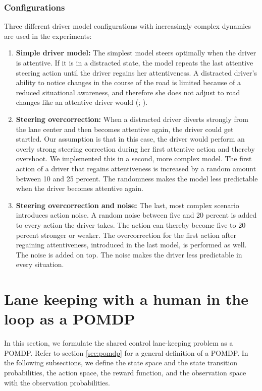 \subsubsection{Configurations}
\label{sec:driver_model_config}

Three different driver model configurations with increasingly complex dynamics are used in the experiments:
\begin{enumerate}
    \item \textbf{Simple driver model:} The simplest model steers optimally when the driver is attentive. If it is in a distracted state, the model repeats the last attentive steering action until the driver regains her attentiveness. A distracted driver's ability to notice changes in the course of the road is limited because of a reduced situational awareness, and therefore she does not adjust to road changes like an attentive driver would (\cite{driver-awareness}; \cite{driver-awareness2}).
    
    \item \textbf{Steering overcorrection:} When a distracted driver diverts strongly from the lane center and then becomes attentive again, the driver could get startled. Our assumption is that in this case, the driver would perform an overly strong steering correction during her first attentive action and thereby overshoot. We implemented this in a second, more complex model. The first action of a driver that regains attentiveness is increased by a random amount between 10 and 25 percent. The randomness makes the model less predictable when the driver becomes attentive again.
    \item \textbf{Steering overcorrection and noise:} The last, most complex scenario introduces action noise. A random noise between five and 20 percent is added to every action the driver takes. The action can thereby become five to 20 percent stronger or weaker. The overcorrection for the first action after regaining attentiveness, introduced in the last model, is performed as well. The noise is added on top. The noise makes the driver less predictable in every situation.
\end{enumerate}


\section{Lane keeping with a human in the loop as a POMDP}
\label{sec:lane_keeping_loop}

In this section, we formulate the shared control lane-keeping problem as a POMDP. Refer to section \ref{sec:pomdp} for a general definition of a POMDP. In the following subsections, we define the state space and the state transition probabilities, the action space, the reward function, and the observation space with the observation probabilities. 

